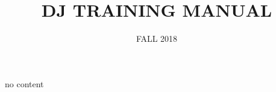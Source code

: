 \documentclass{witrman}
\title{DJ TRAINING MANUAL}
\date{FALL 2018}
\begin{document}
\maketitle

\maketoc

\setpagebg

no content
\end{document}
